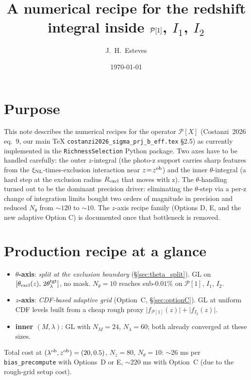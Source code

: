 \documentclass[11pt]{article}
\title{A numerical recipe for the redshift integral inside
       \(\Pop[1]\), \(I_1\), \(I_2\)}
\author{J.~H.~Esteves}
\date{\today}
\newcommand{\lob}{\lambda^{\rm ob}}
\newcommand{\zob}{z^{\rm ob}}
\newcommand{\xinl}{\xi_{\rm NL}}
\newcommand{\Pop}{\mathcal{P}}
\begin{document}
\maketitle

\section*{Purpose}
This note describes the numerical recipes for the operator
\(\Pop[X]\) (Costanzi~2026 eq.~9, our main TeX
\texttt{costanzi2026\_sigma\_prj\_b\_eff.tex} \S2.5) as currently
implemented in the \texttt{RichnessSelection} Python package. Two
axes have to be handled carefully: the outer \(z\)-integral (the
photo-z support carries sharp features from the
\(\xinl\)-times-exclusion interaction near \(z\!=\!\zob\)) and the
inner \(\theta\)-integral (a hard step at the exclusion radius
\(R_{\rm excl}\) that moves with z). The \(\theta\)-handling turned
out to be the dominant precision driver: eliminating the
\(\theta\)-step via a per-z change of integration limits bought two
orders of magnitude in precision and reduced \(N_\theta\) from
\(\sim 120\) to \(\sim 10\). The \(z\)-axis recipe family (Options
D, E, and the new adaptive Option C) is documented once that
bottleneck is removed.

\section*{Production recipe at a glance}
\begin{itemize}
  \item \textbf{\(\theta\)-axis}: \emph{split at the exclusion
        boundary} (\S\ref{sec:theta_split}). GL on
        \([\theta_{\rm excl}(z),\,2\theta_\lambda^{\rm tgt}]\), no mask.
        \(N_\theta = 10\) reaches sub-\(0.01\%\) on \(\Pop[1]\),
        \(I_1\), \(I_2\).
  \item \textbf{\(z\)-axis}: \emph{CDF-based adaptive grid}
        (Option~C, \S\ref{sec:optionC}). GL at uniform CDF levels
        built from a cheap rough proxy
        \(\bigl|f_{\Pop[1]}(z)\bigr|+\bigl|f_{I_2}(z)\bigr|\).
  \item \textbf{inner \((M,\lambda)\)}: GL with
        \(N_M\!=\!24\), \(N_\lambda\!=\!60\); both already converged
        at these sizes.
\end{itemize}

\noindent Total cost at \((\lob,\zob)=(20,0.5)\), \(N_z=80\),
\(N_\theta=10\): \(\sim 26\) ms per \texttt{bias\_precompute}
with Options~D or E, \(\sim 220\) ms with Option~C (due to the
rough-grid setup cost).
\end{document}
